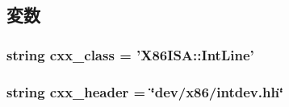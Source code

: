 \subsection{変数}
\hypertarget{classX86IntPin_1_1X86IntLine_a58cd55cd4023648e138237cfc0822ae3}{
\subsubsection[{cxx\_\-class}]{\setlength{\rightskip}{0pt plus 5cm}string {\bf cxx\_\-class} = '{\bf X86ISA::IntLine}'}}
\label{classX86IntPin_1_1X86IntLine_a58cd55cd4023648e138237cfc0822ae3}
\hypertarget{classX86IntPin_1_1X86IntLine_a17da7064bc5c518791f0c891eff05fda}{
\subsubsection[{cxx\_\-header}]{\setlength{\rightskip}{0pt plus 5cm}string {\bf cxx\_\-header} = \char`\"{}dev/x86/intdev.hh\char`\"{}}}
\label{classX86IntPin_1_1X86IntLine_a17da7064bc5c518791f0c891eff05fda}


